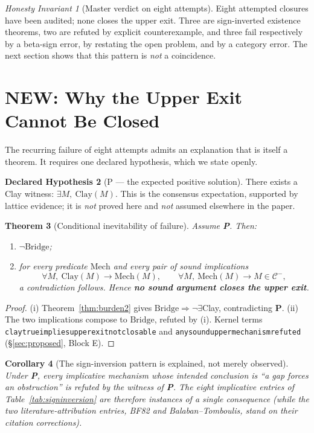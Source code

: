 \documentclass[11pt,a4paper]{article}
\theoremstyle{plain}
\newtheorem{theorem}{Theorem}[section]
\newtheorem{corollary}[theorem]{Corollary}
\theoremstyle{definition}
\newtheorem{hypothesis}[theorem]{Declared Hypothesis}
\theoremstyle{remark}
\newtheorem{invariant}[theorem]{Honesty Invariant}
\newcommand{\Class}{\mathcal{C}}\newcommand{\Htot}{\mathcal{H}}
\renewcommand{\_}{\oldunderscore\allowbreak}
\newcommand{\Lean}[1]{\texttt{\small #1}}
\begin{document}
\begin{invariant}[Master verdict on eight attempts]\label{inv:attacks}
Eight attempted closures have been audited; none closes the upper exit. Three are sign-inverted
existence theorems, two are refuted by explicit counterexample, and three fail respectively by a
beta-sign error, by restating the open problem, and by a category error. The next section shows
that this pattern is \emph{not} a coincidence.
\end{invariant}
\section{NEW: Why the Upper Exit Cannot Be Closed}\label{sec:inevitability}
The recurring failure of eight attempts admits an explanation that is itself a theorem. It
requires one declared hypothesis, which we state openly.
\begin{hypothesis}[P --- the expected positive solution]\label{hyp:P}
There exists a Clay witness: $\exists M,\ \mathrm{Clay}(M)$. This is the consensus expectation,
supported by lattice evidence; it is \emph{not} proved here and \emph{not} assumed elsewhere in
the paper.
\end{hypothesis}
\begin{theorem}[Conditional inevitability of failure]\label{thm:inevitability}
Assume \textbf{P}. Then:
\begin{enumerate}[label=(\roman*),leftmargin=22pt,itemsep=1pt]
\item $\neg\mathrm{Bridge}$;
\item for \emph{every} predicate $\mathrm{Mech}$ and every pair of sound implications
\[
\forall M,\ \mathrm{Clay}(M)\to\mathrm{Mech}(M),
\qquad
\forall M,\ \mathrm{Mech}(M)\to M\in\Class^-,
\]
a contradiction follows. Hence \textbf{no sound argument closes the upper exit}.
\end{enumerate}
\end{theorem}
\begin{proof}
(i) Theorem~\ref{thm:burden2} gives $\mathrm{Bridge}\Rightarrow\neg\exists$Clay, contradicting
\textbf{P}. (ii) The two implications compose to $\mathrm{Bridge}$, refuted by (i). Kernel terms
\Lean{clay\_true\_implies\_upper\_exit\_not\_closable} and
\Lean{any\_sound\_upper\_mechanism\_refuted} (\S\ref{sec:proposed}, Block E).
\end{proof}
\begin{corollary}[The sign-inversion pattern is explained, not merely observed]
\label{cor:pattern}
Under \textbf{P}, every implicative mechanism whose intended conclusion is ``a gap forces an obstruction''
is refuted by the witness of \textbf{P}. The eight implicative entries of Table~\ref{tab:signinversion} are
therefore instances of a single consequence (while the two literature-attribution entries, BF82 and Balaban--Tomboulis, stand on their citation corrections).
\end{corollary}
\end{document}
